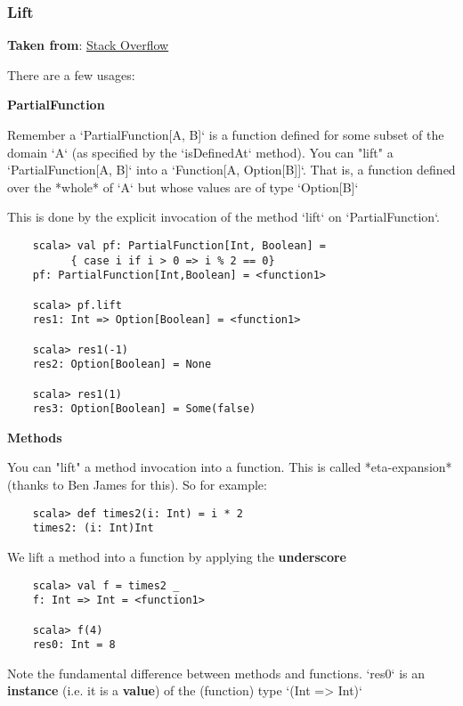 \documentclass{article}
\begin{document}
\subsubsection{Lift}

\textbf{Taken from}: \href{http://stackoverflow.com/questions/17965059/what-is-lifting-in-scala}{Stack Overflow}

There are a few usages:

\textbf{PartialFunction}


Remember a `PartialFunction[A, B]` is a function defined for some subset of the domain `A` (as specified by the `isDefinedAt` method). You can "lift" a `PartialFunction[A, B]` into a `Function[A, Option[B]]`. That is, a function defined over the *whole* of `A` but whose values are of type `Option[B]`

This is done by the explicit invocation of the method `lift` on `PartialFunction`.

\begin{verbatim}
    scala> val pf: PartialFunction[Int, Boolean] = 
          { case i if i > 0 => i % 2 == 0}
    pf: PartialFunction[Int,Boolean] = <function1>

    scala> pf.lift
    res1: Int => Option[Boolean] = <function1>

    scala> res1(-1)
    res2: Option[Boolean] = None

    scala> res1(1)
    res3: Option[Boolean] = Some(false)
\end{verbatim}

\textbf{Methods}

You can "lift" a method invocation into a function. This is called *eta-expansion* (thanks to Ben James for this). So for example:

\begin{verbatim}
    scala> def times2(i: Int) = i * 2
    times2: (i: Int)Int
\end{verbatim}

We lift a method into a function by applying the \textbf{underscore}

\begin{verbatim}
    scala> val f = times2 _
    f: Int => Int = <function1>

    scala> f(4)
    res0: Int = 8
\end{verbatim}

Note the fundamental difference between methods and functions. `res0` is an \textbf{instance} (i.e. it is a \textbf{value}) of the (function) type `(Int => Int)`
\end{document}

